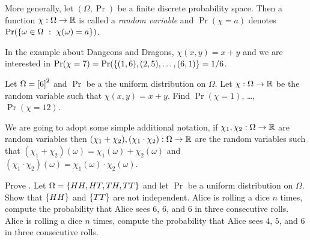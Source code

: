 More generally, let $(\Omega, \Pr)$ be a finite discrete probability space. Then
a function $\chi : \Omega \to {\mathbb{R}}$ is called a \emph{random variable} and 
$\Pr(\chi = a)$ denotes $\Pr(\set[\chi(\omega) = a]{\omega \in \Omega})$. 

In the example about Dangeons and Dragons, $\chi(x, y) = x + y$ and 
we are interested in $\Pr(\chi = 7) = \Pr(\set{(1, 6), (2, 5), \dots, (6, 1)} =
1/ 6$.
\begin{exercise}
  Let $\Omega = {[{6}]}^2$ and $\Pr$ be a the uniform distribution on
  $\Omega$. Let $\chi : \Omega \to {\mathbb{R}}$ be the random variable such that 
  $\chi(x, y) = x + y$. Find $\Pr(\chi = 1)$, \dots, $\Pr(\chi = 12)$.
\end{exercise}

We are going to adopt some simple additional notation, if 
$\chi_1, \chi_2 : \Omega \to {\mathbb{R}}$ are random variables then 
$(\chi_1 + \chi_2), (\chi_1 \cdot \chi_2) : \Omega \to {\mathbb{R}}$ are the random
variables such that $(\chi_1 + \chi_2)(\omega) = \chi_1(\omega) +
\chi_2(\omega)$ and $(\chi_1 \cdot \chi_2)(\omega) = \chi_1(\omega) \cdot
\chi_2(\omega)$.

\begin{chapterendexercises}
  \exercise Prove .
  \exercise Let $\Omega = \set{HH, HT, TH, TT}$ and let $\Pr$ be a uniform
    distribution on $\Omega$. Show that $\set{HH}$ and $\set{TT}$ are not
    independent.
  \exercise Alice is rolling a dice $n$ times, compute the probability
    that Alice sees $6$, $6$, and $6$ in three consecutive rolls.
  \exercise Alice is rolling a dice $n$ times, compute the probability
    that Alice sees $4$, $5$, and $6$ in three consecutive rolls.
\end{chapterendexercises}
